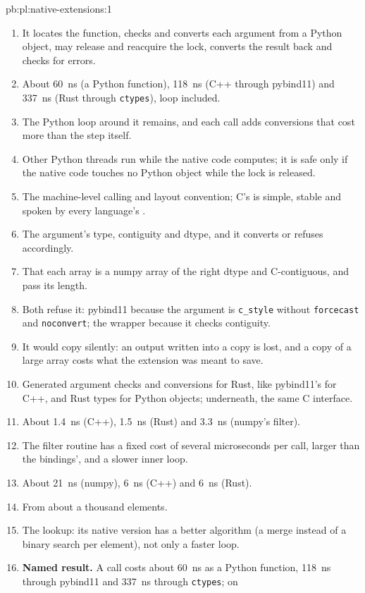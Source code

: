 \begin{solution}{pb:pl:native-extensions:1}
\begin{enumerate}
\item It locates the function, checks and converts each argument from a Python object, may release and reacquire the lock, converts the
result back and checks for errors.
\item About 60~ns (a Python function), 118~ns (C++ through pybind11) and 337~ns (Rust through \texttt{ctypes}), loop included.
\item The Python loop around it remains, and each call adds conversions that cost more than the step itself.
\item Other Python threads run while the native code computes; it is safe only if the native code touches no Python object while the lock
is released.
\item The machine-level calling and layout convention; C's is simple, stable and spoken by every language's .
\item The argument's type, contiguity and dtype, and it converts or refuses accordingly.
\item That each array is a numpy array of the right dtype and C-contiguous, and pass its length.
\item Both refuse it: pybind11 because the argument is \texttt{c\_style} without \texttt{forcecast} and \texttt{noconvert}; the wrapper
because it checks contiguity.
\item It would copy silently: an output written into a copy is lost, and a copy of a large array costs what the extension was meant to
save.
\item Generated argument checks and conversions for Rust, like pybind11's for C++, and Rust types for Python objects; underneath, the same C
interface.
\item About 1.4~ns (C++), 1.5~ns (Rust) and 3.3~ns (numpy's filter).
\item The filter routine has a fixed cost of several microseconds per call, larger than the bindings', and a slower inner loop.
\item About 21~ns (numpy), 6~ns (C++) and 6~ns (Rust).
\item From about a thousand elements.
\item The lookup: its native version has a better algorithm (a merge instead of a binary search per element), not only a faster loop.
\item \textbf{Named result.} A call costs about 60~ns as a Python function, 118~ns through pybind11 and 337~ns through \texttt{ctypes}; on

\end{enumerate}
\end{solution}
